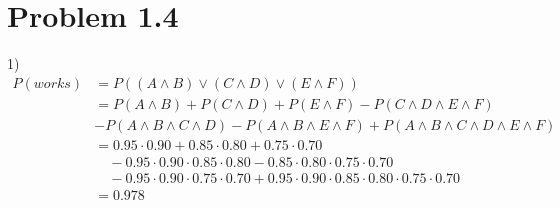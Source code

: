 \documentclass[a4paper]{article}
\begin{document}
\section{Problem 1.4}
1) 
\begin{align*}
    P(works) &= P((A \land B) \lor (C \land D) \lor (E \land F)) \\ 
    &= P(A \land B) + P(C \land D) + P(E \land F) - P(C \land D \land E \land F) \\
    &- P(A \land B \land C \land D) - P(A \land B \land E \land F) + P(A \land B \land C \land D \land E \land F)\\
    &=0.95\cdot 0.90 + 0.85 \cdot 0.80 + 0.75\cdot0.70 \\
    &\quad- 0.95\cdot0.90\cdot0.85\cdot0.80 - 0.85\cdot0.80\cdot0.75\cdot0.70\\
    &\quad- 0.95\cdot0.90\cdot0.75\cdot0.70 + 0.95\cdot0.90\cdot0.85\cdot0.80\cdot0.75\cdot0.70 \\
    &=0.978
\end{align*}
\end{document}
